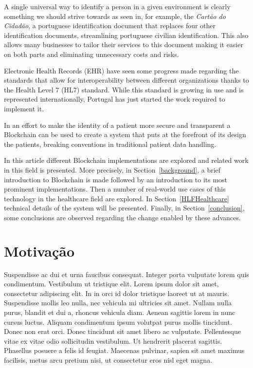 A single universal way to identify a person in a given environment is clearly
something we should strive towards as seen in, for example, the \textit{Cartão
do Cidadão}, a portuguese identification document that replaces four other
identification documents, streamlining portuguese civilian identification.
This also allows many businesses to tailor their services to this document
making it easier on both parts and eliminating unnecessary costs and risks.

Electronic Health Records (EHR) have seen some progress made regarding the
standards that allow for interoperability between different organizations
thanks to the Health Level 7 (HL7) standard.  While this standard is growing in
use and is represented internationally, Portugal has just started the work
required to implement it.  \cite{HealthLevel7}

In an effort to make the identity of a patient more secure and transparent a
Blockchain can be used to create a system that puts at the forefront of its
design the patients, breaking conventions in traditional patient data handling.

In this article different Blockchain implementations are explored and related
work in this field is presented.  More precisely, in Section~\ref{background},
a brief introduction to Blockchain is made followed by an introduction to its
most prominent implementations. Then a number of real-world use cases of this
technology in the healthcare field are explored. In Section~\ref{HLFHealthcare}
technical details of the system will be presented.  Finally, in
Section~\ref{conclusion},  some conclusions are observed regarding the change
enabled by these advances.

\section{Motivação}

Suspendisse ac dui et urna faucibus consequat. Integer porta vulputate lorem quis condimentum. Vestibulum ut tristique elit. Lorem ipsum dolor sit amet, consectetur adipiscing elit. In in orci id dolor tristique laoreet ut at mauris. Suspendisse mollis leo nulla, nec vehicula mi ultricies sit amet. Nullam nulla purus, blandit et dui a, rhoncus vehicula diam. Aenean sagittis lorem in nunc cursus luctus. Aliquam condimentum ipsum volutpat purus mollis tincidunt. Donec non erat orci. Donec tincidunt sit amet libero ac vulputate. Pellentesque vitae ex vitae odio sollicitudin vestibulum. Ut hendrerit placerat sagittis. Phasellus posuere a felis id feugiat. Maecenas pulvinar, sapien sit amet maximus facilisis, metus arcu pretium nisi, ut consectetur eros nisl eget magna.

